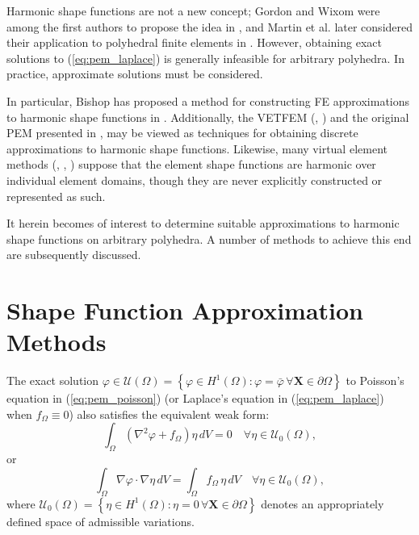 	Harmonic shape functions are not a new concept; Gordon and Wixom were among the first authors to propose the idea in \cite{Gordon:74}, and Martin et al. later considered their application to polyhedral finite elements in \cite{Martin:08}. However, obtaining exact solutions to (\ref{eq:pem_laplace}) is generally infeasible for arbitrary polyhedra. In practice, approximate solutions must be considered.
	
	In particular, Bishop has proposed a method for constructing FE approximations to harmonic shape functions in \cite{Bishop:14}. Additionally, the VETFEM (\cite{Rashid:00}, \cite{Rashid:06}) and the original PEM presented in \cite{Rashid:12}, may be viewed as techniques for obtaining discrete approximations to harmonic shape functions. Likewise, many virtual element methods (\cite{Chi:17}, \cite{Veiga:13}, \cite{Veiga:15}) suppose that the element shape functions are harmonic over individual element domains, though they are never explicitly constructed or represented as such.
	
	It herein becomes of interest to determine suitable approximations to harmonic shape functions on arbitrary polyhedra. A number of methods to achieve this end are subsequently discussed.
	
\section{Shape Function Approximation Methods} \label{sec:approximations}
	
	The exact solution $\varphi \in \mathcal{U} (\Omega) = \left\{ \varphi \in H^1(\Omega) : \varphi = \bar{\varphi} \, \forall \mathbf{X} \in \partial \Omega \right\}$ to Poisson's equation in (\ref{eq:pem_poisson}) (or Laplace's equation in (\ref{eq:pem_laplace}) when $f_\Omega \equiv 0$) also satisfies the equivalent weak form:
	\begin{equation}
		\int_\Omega (\nabla^2 \varphi + f_{\Omega}) \eta \, dV = 0 \quad \forall \eta \in \mathcal{U}_0 (\Omega),
		\label{eq:initial_weak}
	\end{equation}
	or
	\begin{equation}
		\int_\Omega \nabla \varphi \cdot \nabla \eta \, dV = \int_\Omega f_{\Omega} \, \eta \, dV \quad \forall \eta \in \mathcal{U}_0 (\Omega),
		\label{eq:weak_bvp}
	\end{equation}
	where $\mathcal{U}_0 (\Omega) = \left\{ \eta \in H^1(\Omega) : \eta = 0 \, \forall \mathbf{X} \in \partial \Omega \right\}$ denotes an appropriately defined space of admissible variations.
	
